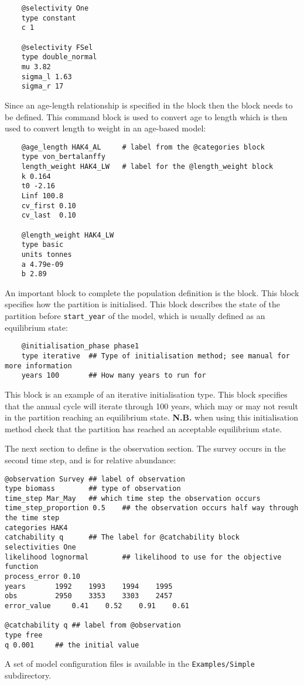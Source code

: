 {\small{\begin{verbatim}
	@selectivity One
	type constant 
	c 1
	
	@selectivity FSel
	type double_normal 
	mu 3.82
	sigma_l 1.63
	sigma_r 17
\end{verbatim}}}

Since an age-length relationship is specified in the  block then the  block needs to be defined. This command block is used to convert age to length which is then used to convert length to weight in an age-based model:

{\small{\begin{verbatim}
	@age_length HAK4_AL		# label from the @categories block
	type von_bertalanffy
	length_weight HAK4_LW	# label for the @length_weight block
	k 0.164
	t0 -2.16
	Linf 100.8
	cv_first 0.10
	cv_last  0.10
	
	@length_weight HAK4_LW
	type basic
	units tonnes
	a 4.79e-09 
	b 2.89 
\end{verbatim}}}

An important block to complete the population definition is the  block. This block specifies how the partition is initialised. This block describes the state of the partition before \texttt{start\_year} of the model, which is usually defined as an equilibrium state:

{\small{\begin{verbatim}
	@initialisation_phase phase1
	type iterative	## Type of initialisation method; see manual for more information
	years 100		## How many years to run for
\end{verbatim}}}

This block is an example of an iterative initialisation type. This block specifies that the annual cycle will iterate through 100 years, which may or may not result in the partition reaching an equilibrium state. \textbf{N.B.} when using this initialisation method check that the partition has reached an acceptable equilibrium state.

The next section to define is the observation section. The survey occurs in the second time step, and is for relative abundance:

{\small{\begin{verbatim}
@observation Survey	## label of observation
type biomass 		## type of observation
time_step Mar_May	## which time step the observation occurs
time_step_proportion 0.5	## the observation occurs half way through the time step
categories HAK4
catchability q		## The label for @catchability block
selectivities One
likelihood lognormal		## likelihood to use for the objective function
process_error 0.10
years 		1992 	1993 	1994 	1995 	
obs 		2950	3353	3303	2457
error_value 	0.41	0.52	0.91	0.61

@catchability q	## label from @observation
type free
q 0.001		## the initial value
		\end{verbatim}}}

A set of model configuration files is available in the \texttt{Examples/Simple} subdirectory.

